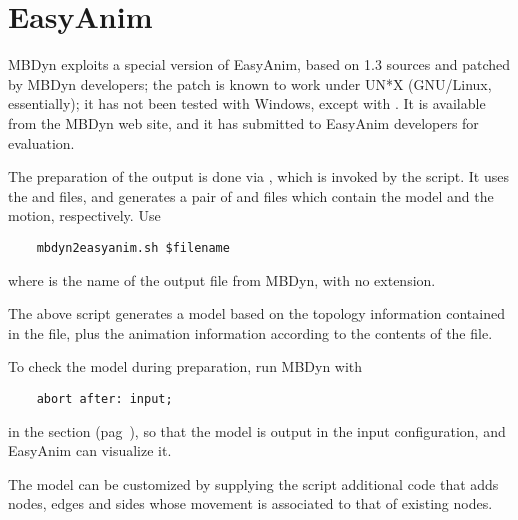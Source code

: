 \section{EasyAnim}
\label{sec:APP:OUTPUTRESULTS:EASYANIM}
MBDyn exploits a special version of EasyAnim, based on 1.3 sources
and patched by MBDyn developers; the patch is known to work under UN*X
(GNU/Linux, essentially); it has not been tested with Windows, except with
.
It is available from the MBDyn web site, and it has submitted to EasyAnim
developers for evaluation.

The preparation of the output is done via , which is invoked
by the  script.
It uses the  and  files, and generates a pair of
 and  files which contain the model and the motion,
respectively.
Use
\begin{verbatim}
    mbdyn2easyanim.sh $filename
\end{verbatim}
where  is the name of the output file from MBDyn,
with no extension.

The above script generates a model based on the topology information
contained in the  file, plus the animation information
according to the contents of the  file.

To check the model during preparation, run MBDyn with
\begin{verbatim}
    abort after: input;
\end{verbatim}
in the  section (pag~\pageref{sec:IVP:abort after}),
so that the model is output in the input configuration,
and EasyAnim can visualize it.

The model can be customized by supplying the 
script additional  code that adds nodes, edges and sides 
whose movement is associated to that of existing nodes.

